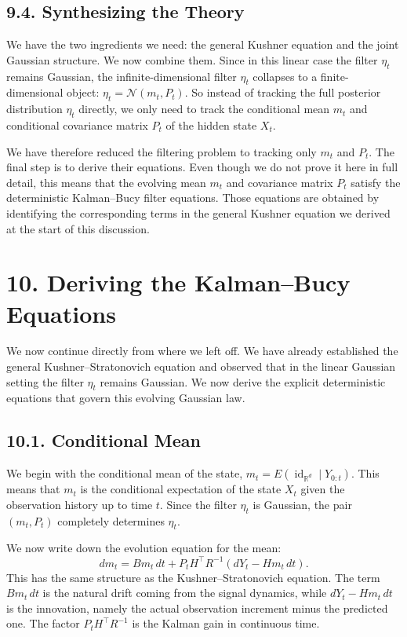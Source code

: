 \documentclass[11pt]{article}
\theoremstyle{definition}
\theoremstyle{remark}
\begin{document}
\subsection*{9.4. Synthesizing the Theory}
We have the two ingredients we need: the general Kushner equation and the joint Gaussian structure. We now combine them. Since in this linear case the filter $\eta_t$ remains Gaussian, the infinite-dimensional filter $\eta_t$ collapses to a finite-dimensional object: $\eta_t=\mathcal N(m_t,P_t)$. So instead of tracking the full posterior distribution $\eta_t$ directly, we only need to track the conditional mean $m_t$ and conditional covariance matrix $P_t$ of the hidden state $X_t$.

We have therefore reduced the filtering problem to tracking only $m_t$ and $P_t$. The final step is to derive their equations. Even though we do not prove it here in full detail, this means that the evolving mean $m_t$ and covariance matrix $P_t$ satisfy the deterministic Kalman--Bucy filter equations. Those equations are obtained by identifying the corresponding terms in the general Kushner equation we derived at the start of this discussion.

\section*{10. Deriving the Kalman--Bucy Equations}
We now continue directly from where we left off. We have already established the general Kushner--Stratonovich equation and observed that in the linear Gaussian setting the filter $\eta_t$ remains Gaussian. We now derive the explicit deterministic equations that govern this evolving Gaussian law.

\subsection*{10.1. Conditional Mean}
We begin with the conditional mean of the state, $m_t=E(\operatorname{id}_{\mathbb R^d}\mid Y_{0:t})$. This means that $m_t$ is the conditional expectation of the state $X_t$ given the observation history up to time $t$. Since the filter $\eta_t$ is Gaussian, the pair $(m_t,P_t)$ completely determines $\eta_t$.

We now write down the evolution equation for the mean:
\[
dm_t
=
Bm_t\,dt
+P_tH^\top R^{-1}(dY_t-Hm_t\,dt).
\]
This has the same structure as the Kushner--Stratonovich equation. The term $Bm_t\,dt$ is the natural drift coming from the signal dynamics, while $dY_t-Hm_t\,dt$ is the innovation, namely the actual observation increment minus the predicted one. The factor $P_tH^\top R^{-1}$ is the Kalman gain in continuous time.
\end{document}
